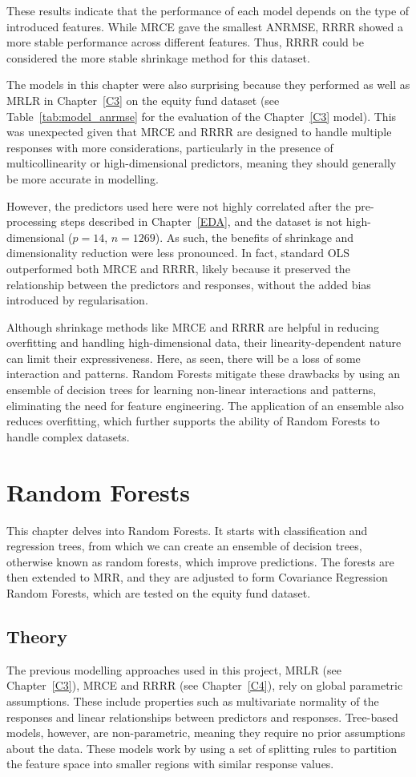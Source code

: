 \documentclass[11pt]{report} %
\begin{document}
These results indicate that the performance of each model depends on the type of introduced features. 
While MRCE gave the smallest ANRMSE, RRRR showed a more stable performance across different features. Thus, RRRR could be considered the more stable shrinkage method for this dataset.

The models in this chapter were also surprising because they performed as well as MRLR in Chapter~\ref{C3} on the equity fund dataset (see Table~\ref{tab:model_anrmse} for the evaluation of the Chapter~\ref{C3} model). This was unexpected given that MRCE and RRRR are designed to handle multiple responses with more considerations, particularly in the presence of multicollinearity or high-dimensional predictors, meaning they should generally be more accurate in modelling. 

However, the predictors used here were not highly correlated after the pre-processing steps described in Chapter~\ref{EDA}, and the dataset is not high-dimensional ($p = 14$, $n = 1269$). As such, the benefits of shrinkage and dimensionality reduction were less pronounced. In fact, standard OLS outperformed both MRCE and RRRR, likely because it preserved the relationship between the predictors and responses, without the added bias introduced by regularisation. 

Although shrinkage methods like MRCE and RRRR are helpful in reducing overfitting and handling high-dimensional data, their linearity-dependent nature can limit their expressiveness. Here, as seen, there will be a loss of some interaction and patterns. Random Forests mitigate these drawbacks by using an ensemble of decision trees for learning non-linear interactions and patterns, eliminating the need for feature engineering. The application of an ensemble also reduces overfitting, which further supports the ability of Random Forests to handle complex datasets.

\chapter{Random Forests}
This chapter delves into Random Forests. It starts with classification and regression trees, from which we can create an ensemble of decision trees, otherwise known as random forests, which improve predictions. The forests are then extended to MRR, and they are adjusted to form Covariance Regression Random Forests, which are tested on the equity fund dataset.

\section{Theory}
The previous modelling approaches used in this project, MRLR (see Chapter~\ref{C3}), MRCE and RRRR (see Chapter~\ref{C4}), rely on global parametric assumptions. These include properties such as multivariate normality of the responses and linear relationships between predictors and responses. Tree-based models, however, are non-parametric, meaning they require no prior assumptions about the data. These models work by using a set of splitting rules to partition the feature space into smaller regions with similar response values.
\end{document}
